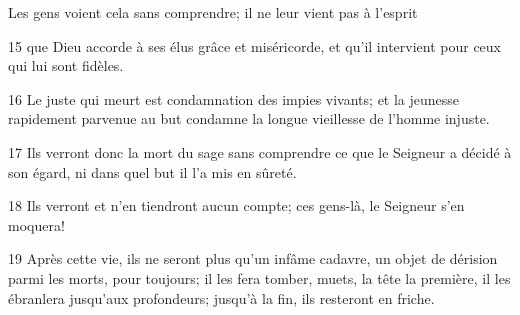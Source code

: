 Les gens voient cela sans comprendre; il ne leur vient pas à l’esprit

15 que Dieu accorde à ses élus grâce et miséricorde, et qu’il intervient pour ceux qui lui sont fidèles.

16 Le juste qui meurt est condamnation des impies vivants; et la jeunesse rapidement parvenue au but condamne la longue vieillesse de l’homme injuste.

17 Ils verront donc la mort du sage sans comprendre ce que le Seigneur a décidé à son égard, ni dans quel but il l’a mis en sûreté.

18 Ils verront et n’en tiendront aucun compte; ces gens-là, le Seigneur s’en moquera!

19 Après cette vie, ils ne seront plus qu’un infâme cadavre, un objet de dérision parmi les morts, pour toujours; il les fera tomber, muets, la tête la première, il les ébranlera jusqu’aux profondeurs; jusqu’à la fin, ils resteront en friche.